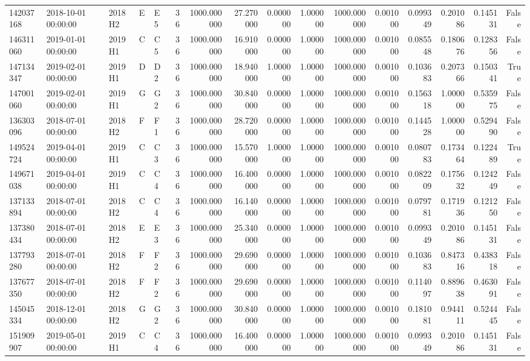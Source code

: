 \begin{tabular}{lllllrrrrrrrrrrr}
142037168 & 2018-10-01 00:00:00 & 2018H2 & E & E5 & 36 & 1000.000000 & 27.270000 & 0.000000 & 1.000000 & 1000.000000 & 0.001000 & 0.099349 & 0.201086 & 0.145131 & False \\
146311060 & 2019-01-01 00:00:00 & 2019H1 & C & C5 & 36 & 1000.000000 & 16.910000 & 0.000000 & 1.000000 & 1000.000000 & 0.001000 & 0.085548 & 0.180676 & 0.128356 & False \\
147134347 & 2019-02-01 00:00:00 & 2019H1 & D & D2 & 36 & 1000.000000 & 18.940000 & 1.000000 & 1.000000 & 1000.000000 & 0.001000 & 0.103683 & 0.207366 & 0.150341 & True \\
147001060 & 2019-02-01 00:00:00 & 2019H1 & G & G2 & 36 & 1000.000000 & 30.840000 & 0.000000 & 1.000000 & 1000.000000 & 0.001000 & 0.156318 & 1.000000 & 0.535975 & False \\
136303096 & 2018-07-01 00:00:00 & 2018H2 & F & F1 & 36 & 1000.000000 & 28.720000 & 0.000000 & 1.000000 & 1000.000000 & 0.001000 & 0.144528 & 1.000000 & 0.529490 & False \\
149524724 & 2019-04-01 00:00:00 & 2019H1 & C & C3 & 36 & 1000.000000 & 15.570000 & 1.000000 & 1.000000 & 1000.000000 & 0.001000 & 0.080783 & 0.173464 & 0.122489 & True \\
149671038 & 2019-04-01 00:00:00 & 2019H1 & C & C4 & 36 & 1000.000000 & 16.400000 & 0.000000 & 1.000000 & 1000.000000 & 0.001000 & 0.082209 & 0.175632 & 0.124249 & False \\
137133894 & 2018-07-01 00:00:00 & 2018H2 & C & C4 & 36 & 1000.000000 & 16.140000 & 0.000000 & 1.000000 & 1000.000000 & 0.001000 & 0.079781 & 0.171936 & 0.121250 & False \\
137380434 & 2018-07-01 00:00:00 & 2018H2 & E & E3 & 36 & 1000.000000 & 25.340000 & 0.000000 & 1.000000 & 1000.000000 & 0.001000 & 0.099349 & 0.201086 & 0.145131 & False \\
137793280 & 2018-07-01 00:00:00 & 2018H2 & F & F2 & 36 & 1000.000000 & 29.690000 & 0.000000 & 1.000000 & 1000.000000 & 0.001000 & 0.103683 & 0.847316 & 0.438318 & False \\
137677350 & 2018-07-01 00:00:00 & 2018H2 & F & F2 & 36 & 1000.000000 & 29.690000 & 0.000000 & 1.000000 & 1000.000000 & 0.001000 & 0.114097 & 0.889638 & 0.463091 & False \\
145045334 & 2018-12-01 00:00:00 & 2018H2 & G & G2 & 36 & 1000.000000 & 30.840000 & 0.000000 & 1.000000 & 1000.000000 & 0.001000 & 0.181081 & 0.944111 & 0.524445 & False \\
151909907 & 2019-05-01 00:00:00 & 2019H1 & C & C4 & 36 & 1000.000000 & 16.400000 & 0.000000 & 1.000000 & 1000.000000 & 0.001000 & 0.099349 & 0.201086 & 0.145131 & False \\

\end{tabular}
